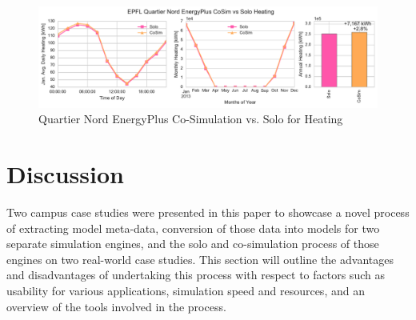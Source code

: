 \documentclass{tBPS2e}
\theoremstyle{plain}
\theoremstyle{definition}
\theoremstyle{remark}
\newcommand{\noteCM}[1]{\footnote{\textcolor{red}{#1}}}
\begin{document}
\begin{figure}[H]
\centering
\includegraphics[scale=0.55]{figures/QN_EnergyPlus_Heating}
\caption{Quartier Nord EnergyPlus Co-Simulation vs. Solo for Heating}
\label{fig:qn_eplus_cosimvssolo_heating}
\end{figure}





\section{Discussion}
Two campus case studies were presented in this paper to showcase a novel process of extracting 
model meta-data, conversion of those data into models for two separate simulation engines, and the solo
and co-simulation process of those engines on two real-world case studies. This section will outline 
the advantages and disadvantages of undertaking this process with respect to factors such as 
usability for various applications, simulation speed and resources, and an overview of the tools 
involved in the process.
\end{document}
